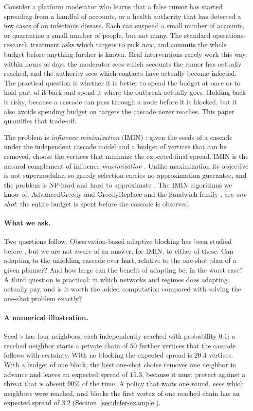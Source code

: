 \documentclass[11pt]{article}
\theoremstyle{definition}
\theoremstyle{remark}
\begin{document}
Consider a platform moderator who learns that a false rumor has started spreading from a handful of accounts, or a health authority that has detected a few cases of an infectious disease. Each can suspend a small number of accounts, or quarantine a small number of people, but not many. The standard operations-research treatment asks which targets to pick \emph{now}, and commits the whole budget before anything further is known. Real interventions rarely work this way: within hours or days the moderator sees which accounts the rumor has actually reached, and the authority sees which contacts have actually become infected. The practical question is whether it is better to spend the budget at once or to hold part of it back and spend it where the outbreak actually goes. Holding back is risky, because a cascade can pass through a node before it is blocked, but it also avoids spending budget on targets the cascade never reaches. This paper quantifies that trade-off.

The problem is \emph{influence minimization} (IMIN) \citep{xie2023,xie2024}: given the seeds of a cascade under the independent cascade model and a budget of vertices that can be removed, choose the vertices that minimize the expected final spread. IMIN is the natural complement of influence \emph{maximization} \citep{kempe2003}. Unlike maximization its objective is not supermodular, so greedy selection carries no approximation guarantee, and the problem is NP-hard and hard to approximate \citep{xie2023}. The IMIN algorithms we know of, AdvancedGreedy and GreedyReplace \citep{xie2023,xie2024} and the Sandwich family \citep{wang2024sandwich}, are \emph{one-shot}: the entire budget is spent before the cascade is observed.

\paragraph{What we ask.} Two questions follow. Observation-based adaptive blocking has been studied before \citep{shi2019}, but we are not aware of an answer, for IMIN, to either of these. Can adapting to the unfolding cascade ever hurt, relative to the one-shot plan of a given planner? And how large can the benefit of adapting be, in the worst case? A third question is practical: in which networks and regimes does adapting actually pay, and is it worth the added computation compared with solving the one-shot problem exactly?

\paragraph{A numerical illustration.} Seed $s$ has four neighbors, each independently reached with probability $0.1$; a reached neighbor starts a private chain of $50$ further vertices that the cascade follows with certainty. With no blocking the expected spread is $20.4$ vertices. With a budget of one block, the best one-shot choice removes one neighbor in advance and leaves an expected spread of $15.3$, because it must protect against a threat that is absent $90\%$ of the time. A policy that waits one round, sees which neighbors were reached, and blocks the first vertex of one reached chain has an expected spread of $3.2$ (Section~\ref{sec:defer-example}).
\end{document}
